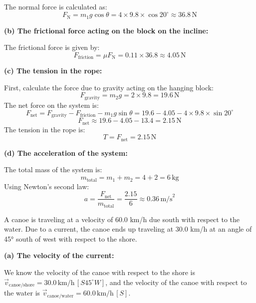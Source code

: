 \documentclass[addpoints]{exam}
\begin{document}
\begin{questions}
\begin{solution}[5cm]
The normal force is calculated as:
\[
F_{\text{N}} = m_1 g \cos \theta = 4 \times 9.8 \times \cos 20^\circ \approx 36.8 \, \text{N}
\]

\textbf{(b) The frictional force acting on the block on the incline:}

The frictional force is given by:
\[
F_{\text{friction}} = \mu F_{\text{N}} = 0.11 \times 36.8 \approx 4.05 \, \text{N}
\]

\textbf{(c) The tension in the rope:}

First, calculate the force due to gravity acting on the hanging block:
\[
F_{\text{gravity}} = m_2 g = 2 \times 9.8 = 19.6 \, \text{N}
\]
The net force on the system is:
\[
F_{\text{net}} = F_{\text{gravity}} - F_{\text{friction}} - m_1 g \sin \theta = 19.6 - 4.05 - 4 \times 9.8 \times \sin 20^\circ
\]
\[
F_{\text{net}} \approx 19.6 - 4.05 - 13.4 = 2.15 \, \text{N}
\]
The tension in the rope is:
\[
T = F_{\text{net}} = 2.15 \, \text{N}
\]

\textbf{(d) The acceleration of the system:}

The total mass of the system is:
\[
m_{\text{total}} = m_1 + m_2 = 4 + 2 = 6 \, \text{kg}
\]
Using Newton's second law:
\[
a = \frac{F_{\text{net}}}{m_{\text{total}}} = \frac{2.15}{6} \approx 0.36 \, \text{m/s}^2
\]
\end{solution}



\question A canoe is traveling at a velocity of 60.0 km/h due south with respect to the water. Due to a current, the canoe ends up traveling at 30.0 km/h at an angle of 45° south of west with respect to the shore.
\begin{solution}[5cm]
\textbf{(a) The velocity of the current:}

We know the velocity of the canoe with respect to the shore is \( \vec{v}_{\text{canoe/shore}} = 30.0 \, \text{km/h} \, [S 45^\circ W] \), and the velocity of the canoe with respect to the water is \( \vec{v}_{\text{canoe/water}} = 60.0 \, \text{km/h} \, [S] \).


\end{solution}
\end{questions}
\end{document}
